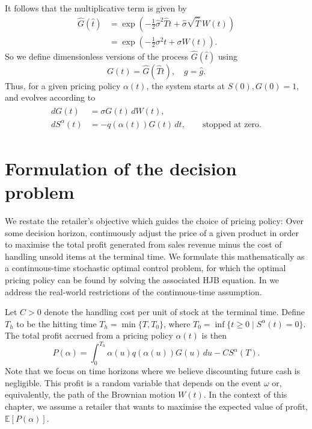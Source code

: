 \documentclass[main.tex]{subfiles}
\begin{document}
It follows that the multiplicative term is given by
\begin{align}
  \hat{G}(\hat{t})
  &=\exp\left(
    -{\textstyle\frac{1}{2}}\hat{\sigma}^2\hat{T}t +\hat{\sigma} \sqrt{\hat{T}}\,W(t)\right)\\
  &=\exp\left(-{\textstyle\frac{1}{2}}\sigma^2t +\sigma W(t)\right).
\end{align}
So we define dimensionless versions of the process $\hat{G}(\hat{t})$
using
\begin{equation}
  G(t)=\hat{G}(\hat{T}t),\quad g=\hat{g}.
\end{equation}
Thus, for a given pricing policy $\alpha(t)$, the
system starts at $S(0),G(0)=1$, and evolves according to
\begin{align}
  \begin{split}\label{eq:gbm_sde_nondim}
    d G(t)&=\sigma G(t)\,dW(t),\\
    dS^{\alpha}(t)&=-q(\alpha(t))G(t)\,dt,
    \qquad\text{stopped at zero}.
  \end{split}
\end{align}



\section{Formulation of the decision
  problem}\label{sec:decision_formulation}
We restate the retailer's objective which
guides the choice of pricing policy: Over some decision horizon, continuously
adjust the price of a given product in order to maximise
the total profit generated from sales revenue minus the cost of handling
unsold items at the terminal time. We formulate this mathematically as
a continuous-time stochastic optimal control problem, for which the optimal pricing
policy can be found by solving the associated HJB equation.
In  we address the real-world restrictions of
the continuous-time assumption.

Let $C>0$ denote the handling cost per unit of stock at the terminal
time. Define $T_h$ to be the hitting time $T_h=\min \{T, T_0\}$, where
$T_0=\inf\{t\geq 0\mid S^\alpha(t)=0\}$.
The total profit accrued from a pricing policy $\alpha(t)$ is then
\begin{equation}\label{eq:profit_expression}
  P(\alpha) = \int_0^{T_h}\alpha(u)q(\alpha(u))G(u)\,du - CS^\alpha(T).
\end{equation}
Note that we focus on time horizons where we believe discounting
future cash is negligible.
This profit is a random variable that depends on the event $\omega$
or, equivalently, the path of the
Brownian motion $W(t)$. %
In the context of this chapter, we assume a retailer that
wants to maximise the expected value of profit, $\mathbb
E[P(\alpha)]$.
\end{document}
